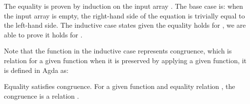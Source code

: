 \documentclass{l4proj}
\begin{document}
The equality is proven by induction on the input array . The base case is: when the input array is empty, the right-hand side of the equation is trivially equal to the left-hand side. The inductive case states given the equality holds for , we are able to prove it holds for \AgdaSymbol{(}\AgdaSpace{}%
\AgdaSpace{}%
\AgdaSymbol{)}\AgdaSpace{}.

Note that the  function in the inductive case represents congruence, which is relation for a given function when it is preserved by applying a given function, it is defined in Agda as: 
\begin{code}%
\>[0]\AgdaSpace{}%
\AgdaSymbol{:}\AgdaSpace{}%
\AgdaSymbol{\{}\AgdaSpace{}%
\AgdaSpace{}%
\AgdaSymbol{:}\AgdaSpace{}%
\AgdaSymbol{\}}\AgdaSpace{}%
\AgdaSpace{}%
\AgdaSpace{}%
\AgdaSymbol{(}\AgdaSpace{}%
\AgdaSymbol{:}\AgdaSpace{}%
\AgdaSpace{}%
\AgdaSpace{}%
\AgdaSymbol{)}\AgdaSpace{}%
\AgdaSymbol{\{}\AgdaSpace{}%
\AgdaSymbol{\}}\AgdaSpace{}%
\AgdaSpace{}%
\AgdaSpace{}%
\AgdaSpace{}%
\AgdaSpace{}%
\AgdaSpace{}%
\AgdaSpace{}%
\AgdaSpace{}%
\AgdaSpace{}%
\AgdaSpace{}%
\<%
\end{code}
Equality satisfies congruence. For a given function  and equality relation \AgdaSpace{}\AgdaSpace{}, the congruence is a relation \AgdaSpace{}\AgdaSpace{}\AgdaSpace{}\AgdaSpace{}.
\end{document}
